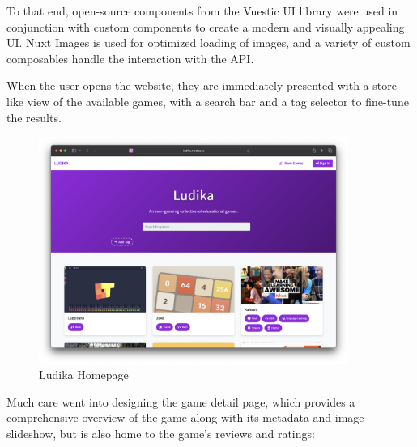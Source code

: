 \documentclass[11pt,italian,a4paper]{article}
\begin{document}
To that end, open-source components from the Vuestic UI library were used in conjunction with custom components to create a modern and visually appealing UI. Nuxt Images is used for optimized loading of images, and a variety of custom composables handle the interaction with the API.

When the user opens the website, they are immediately presented with a store-like view of the available games, with a search bar and a tag selector to fine-tune the results.

\begin{figure}[H]
    \centering
    \includegraphics[width=0.9\textwidth,trim={0 2cm 0 1cm}]{figures/ludika_homepage.png}
    \caption{Ludika Homepage}
\end{figure}

Much care went into designing the game detail page, which provides a comprehensive overview of the game along with its metadata and image slideshow, but is also home to the game's reviews and ratings:
\end{document}
